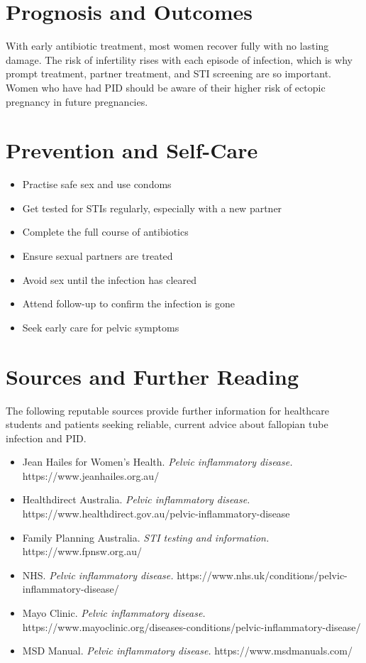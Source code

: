 \section*{Prognosis and Outcomes}
With early antibiotic treatment, most women recover fully with no lasting damage. The risk of infertility rises with each episode of infection, which is why prompt treatment, partner treatment, and STI screening are so important. Women who have had PID should be aware of their higher risk of ectopic pregnancy in future pregnancies.

\section*{Prevention and Self-Care}
\begin{itemize}
    \item Practise safe sex and use condoms
    \item Get tested for STIs regularly, especially with a new partner
    \item Complete the full course of antibiotics
    \item Ensure sexual partners are treated
    \item Avoid sex until the infection has cleared
    \item Attend follow-up to confirm the infection is gone
    \item Seek early care for pelvic symptoms
\end{itemize}

\section*{Sources and Further Reading}
The following reputable sources provide further information for healthcare students and patients seeking reliable, current advice about fallopian tube infection and PID.
\begin{itemize}
    \item Jean Hailes for Women's Health. \textit{Pelvic inflammatory disease.} https://www.jeanhailes.org.au/
    \item Healthdirect Australia. \textit{Pelvic inflammatory disease.} https://www.healthdirect.gov.au/pelvic-inflammatory-disease
    \item Family Planning Australia. \textit{STI testing and information.} https://www.fpnsw.org.au/
    \item NHS. \textit{Pelvic inflammatory disease.} https://www.nhs.uk/conditions/pelvic-inflammatory-disease/
    \item Mayo Clinic. \textit{Pelvic inflammatory disease.} https://www.mayoclinic.org/diseases-conditions/pelvic-inflammatory-disease/
    \item MSD Manual. \textit{Pelvic inflammatory disease.} https://www.msdmanuals.com/
\end{itemize}
